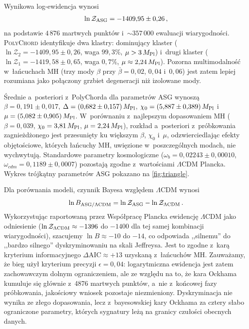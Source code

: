 \documentclass[11pt,a4paper]{article}
\begin{document}
Wynikowa log-ewidencja wynosi
\begin{equation}
\ln\mathcal{Z}_{\rm ASG}=-1409{,}95\pm0{,}26\,,
\label{eq:lnZ}
\end{equation}
na podstawie $4\,876$ martwych punktów i~${\sim}357\,000$ ewaluacji wiarygodności. \textsc{PolyChord} identyfikuje dwa klastry: dominujący klaster ($\ln\mathcal{Z}_2=-1409{,}95\pm0{,}26$, waga $99{,}3\%$, $\mu>3\,M_{\rm Pl}$) i~drugi klaster ($\ln\mathcal{Z}_1=-1419{,}58\pm0{,}65$, waga $0{,}7\%$, $\mu\approx2{,}24\,M_{\rm Pl}$). Pozorna multimodalność w~łańcuchach MH (trzy mody $\beta$ przy $\bar\beta=0{,}02$, $0{,}04$ i~$0{,}06$) jest zatem lepiej rozumiana jako połączony grzbiet degeneracji niż izolowane mody.

Średnie a~posteriori z~PolyChorda dla parametrów ASG wynoszą $\beta=0{,}191\pm0{,}017$, $\Delta=(0{,}682\pm0{,}157)\,M_{\rm Pl}$, $\chi_0=(5{,}887\pm0{,}389)\,M_{\rm Pl}$ i~$\mu=(5{,}082\pm0{,}905)\,M_{\rm Pl}$. W~porównaniu z~najlepszym dopasowaniem MH ($\beta=0{,}039$, $\chi_0=3{,}81\,M_{\rm Pl}$, $\mu=2{,}24\,M_{\rm Pl}$), rozkład a~posteriori z~próbkowania zagnieżdżonego jest przesunięty ku większym $\beta$, $\chi_0$ i~$\mu$, odzwierciedlając efekty objętościowe, których łańcuchy MH, uwięzione w~poszczególnych modach, nie wychwytują. Standardowe parametry kosmologiczne ($\omega_b=0{,}02243\pm0{,}00010$, $\omega_{cdm}=0{,}1189\pm0{,}0007$) pozostają zgodne z~wartościami $\Lambda$CDM Plancka. Wykres trójkątny parametrów ASG pokazano na \cref{fig:triangle}.

Dla porównania modeli, czynnik Bayesa względem $\Lambda$CDM wynosi
\begin{equation}
\ln B_{\rm ASG/\Lambda CDM}=\ln\mathcal{Z}_{\rm ASG}-\ln\mathcal{Z}_{\Lambda\rm CDM}\,.
\end{equation}
Wykorzystując raportowaną przez Współpracę Plancka ewidencję $\Lambda$CDM jako odniesienie ($\ln\mathcal{Z}_{\Lambda\rm CDM}\approx-1396$ do $-1400$ dla tej samej kombinacji wiarygodności), szacujemy $\ln B\approx-10$ do $-14$, co odpowiada ,,silnemu'' do ,,bardzo silnego'' dyskryminowaniu na skali Jeffreysa. Jest to zgodne z~karą kryterium informacyjnego $\Delta\text{AIC}\approx+13$ uzyskaną z~łańcuchów MH. Zauważamy, że bieg użył kryterium precyzji $\epsilon=0{,}04$: logarytmiczna ewidencja jest zatem zachowawczym dolnym ograniczeniem, ale ze względu na to, że kara Ockhama kumuluje się głównie z~4876 martwych punktów, a~nie z~końcowej fazy próbkowania, jakościowy wniosek pozostaje niezmieniony. Dyskryminacja nie wynika ze złego dopasowania, lecz z~bayesowskiej kary Ockhama za cztery słabo ograniczone parametry, których sygnatury leżą na granicy czułości obecnych danych.
\end{document}
